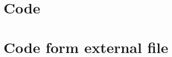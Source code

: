 \documentclass[a4paper, 10pt, fleqn]{article}
\begin{document}
\section{Code}

\section{Code form external file}

\end{document}
